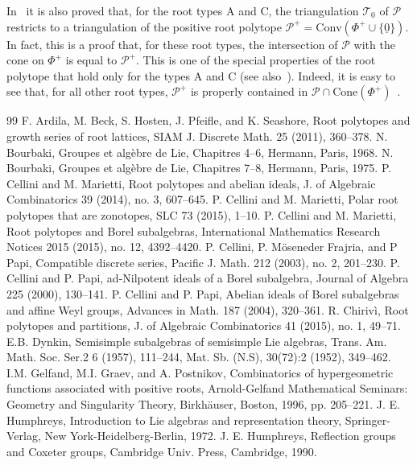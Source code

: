 \documentclass[10pt]{amsart}
\theoremstyle{definition}
\theoremstyle{remark}
\newcommand\mc{\mathcal}
\newcommand\nullvec{\underline 0}
\newcommand\pol{\mathcal P}
\newcommand\conv{\mathrm{Conv}}
\newcommand\cone{\mathrm{Cone}}
\begin{document}
\par
In~\cite{CM2} it is also proved that, for the root types $\mathrm A$ and $\mathrm C$, the triangulation $\mc T_0$ of $\pol$ restricts to a triangulation of the positive root polytope $\pol^+=\conv(\Phi^+\cup \{\nullvec\})$. 
In fact, this is a proof that, for these root types, the intersection of $\pol$ with the cone on $\Phi^+$ is equal to $\pol^+$.
This is one of the special properties of the root polytope that hold only for the  types $\mathrm A$ and $\mathrm C$ (see also~\cite{CM3}).
Indeed, it is easy to see that, for all other root types, $\pol^+$ is properly contained  in $\pol\cap \cone(\Phi^+)$~\cite{Ch}.
\begin{thebibliography}{99}
 F. Ardila, M. Beck, S. Hosten, J. Pfeifle, and K. Seashore, Root polytopes and growth series of root lattices, SIAM J. Discrete Math. 25 (2011), 360--378.
 N. Bourbaki, Groupes et alg\`ebre de Lie, Chapitres 4--6, Hermann, Paris, 1968.
 N. Bourbaki, Groupes et alg\`ebre de Lie, Chapitres 7--8, Hermann, Paris, 1975.
 P. Cellini and M. Marietti, Root polytopes and abelian ideals, J. of Algebraic Combinatorics 39 (2014), no. 3, 607--645.
 P. Cellini and M. Marietti, Polar root polytopes that are zonotopes, SLC 73 (2015), 1--10.
 P. Cellini and M. Marietti, Root polytopes and Borel subalgebras, International Mathematics Research Notices 2015 (2015), no. 12, 4392--4420.
 P. Cellini, P. M\"oseneder Frajria, and P Papi, Compatible discrete series, Pacific J. Math. 212 (2003), no. 2, 201--230.
 P. Cellini and P. Papi, ad-Nilpotent ideals of a Borel subalgebra, Journal of Algebra 225 (2000), 130--141.
 P. Cellini and P. Papi, Abelian ideals of Borel subalgebras and affine Weyl groups, Advances in Math. 187 (2004), 320--361.
 R. Chiriv\`i, Root polytopes and partitions, J. of Algebraic Combinatorics 41 (2015), no. 1, 49--71.
 E.B. Dynkin, Semisimple subalgebras of semisimple Lie algebras, Trans. Am. Math. Soc. Ser.2 6 (1957), 111--244, Mat. Sb. (N.S), 30(72):2 (1952), 349--462.
 I.M. Gelfand, M.I. Graev, and A. Postnikov, Combinatorics of hypergeometric functions associated with positive roots, Arnold-Gelfand Mathematical Seminars: Geometry and Singularity Theory, Birkh\"auser, Boston, 1996, pp. 205--221.
 J. E. Humphreys, Introduction to Lie algebras and representation theory, Springer-Verlag, New York-Heidelberg-Berlin, 1972.
 J. E. Humphreys, Reflection groups and Coxeter groups, Cambridge Univ. Press, Cambridge, 1990.

\end{thebibliography}
\end{document}
